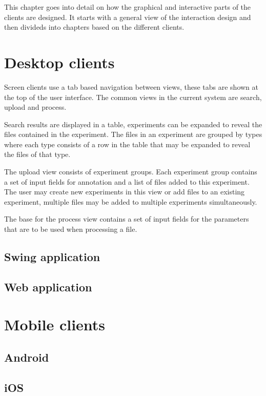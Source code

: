 
This chapter goes into detail on how the graphical and interactive parts of the clients are designed. It starts with a general view of the interaction design and then divideds into chapters based on the different clients.

\section{Desktop clients}
Screen clients use a tab based navigation between views, these tabs are shown at the top of the user interface. The common views in the current system are search, upload and process.

Search results are displayed in a table, experiments can be expanded to reveal the files contained in the experiment. The files in an experiment are grouped by types where each type consists of a row in the table that may be expanded to reveal the files of that type.

The upload view consists of experiment groups. Each experiment group contains a set of input fields for annotation and a list of files added to this experiment. The user may create new experiments in this view or add files to an existing experiment, multiple files may be added to multiple experiments simultaneously.

The base for the process view contains a set of input fields for the parameters that are to be used when processing a file.

\FloatBarrier
\subsection{Swing application}


\FloatBarrier
\subsection{Web application}


\FloatBarrier
\section{Mobile clients}

\FloatBarrier
\subsection{Android}

\FloatBarrier
\subsection{iOS}


